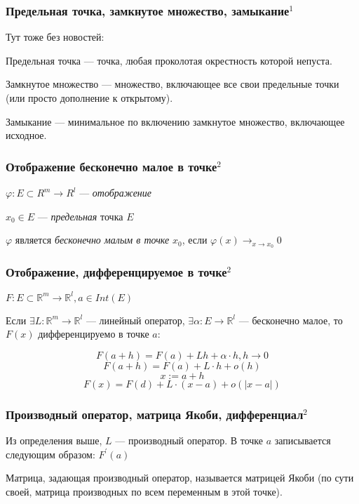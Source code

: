 \documentclass{article}
\begin{document}
\subsubsection{Предельная точка, замкнутое множество, замыкание\texorpdfstring{$^1$}{}}
Тут тоже без новостей:

Предельная точка --- точка, любая проколотая окрестность которой непуста.

Замкнутое множество --- множество, включающее все свои предельные точки (или просто дополнение к открытому).

Замыкание --- минимальное по включению замкнутое множество, включающее исходное.

\subsubsection{Отображение бесконечно малое в точке\texorpdfstring{$^2$}{}}

$\varphi : E \subset R^m \rightarrow R^l$ --- \textit{отображение}

$x_0 \in E$ --- \textit{предельная} точка $E$

$\varphi$ является \textit{бесконечно малым в точке} $x_0$, если $\varphi(x) \rightarrow_{x \rightarrow x_0} 0$

\subsubsection{Отображение, дифференцируемое в точке\texorpdfstring{$^2$}{}}

$F : E \subset \mathbb{R}^m \rightarrow \mathbb{R}^l, a \in Int(E)$

Если $\exists L : \mathbb{R}^m \rightarrow \mathbb{R}^l$ --- линейный оператор, $\exists \alpha : E \rightarrow \mathbb{R}^l$ --- бесконечно малое, то $F(x)$ дифференцируемо в точке $a$:

$$
F(a+h)=F(a)+Lh+\alpha \cdot h, h \rightarrow 0
$$
$$
F(a+h)=F(a)+L \cdot h+o(h)
$$
$$
x:=a+h
$$
$$
F(x)=F(d)+L \cdot(x-a)+o(|x-a|)
$$

\subsubsection{Производный оператор, матрица Якоби, дифференциал\texorpdfstring{$^2$}{}}

Из определения выше, $L$ --- производный оператор.
В точке $a$ записывается следующим образом: $F^\prime(a)$


Матрица, задающая производный оператор, называется матрицей Якоби (по сути своей, матрица производных по всем переменным в этой точке).
\end{document}

